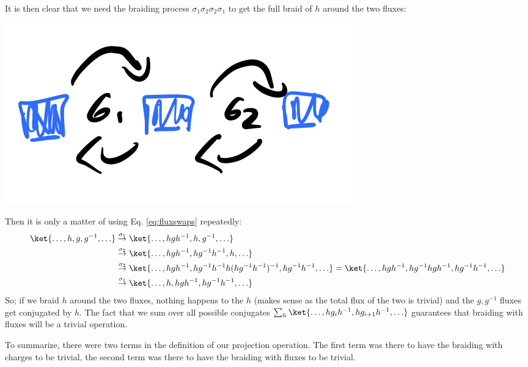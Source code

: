 \begin{enumerate}
    It is then clear that we need the braiding process $\sigma_1\sigma_2\sigma_2\sigma_1$ to get the full braid of $h$ around the two fluxes:
    \begin{center}
        \includegraphics[scale=0.35]{Lectures/Images/lec10-sigmabraid.png}
    \end{center}

    Then it is only a matter of using Eq. \eqref{eq:fluxswaps} repeatedly:
    \begin{equation}
        \begin{split}
            \ket{\ldots, h, g, g^{-1}, \ldots} &\stackrel{\sigma_1}{\to} \ket{\ldots, hgh^{-1}, h, g^{-1}, \ldots}
            \\ &\stackrel{\sigma_2}{\to}\ket{\ldots, hgh^{-1}, hg^{-1}h^{-1}, h, \ldots}
            \\ &\stackrel{\sigma_2}{\to}\ket{\ldots, hgh^{-1}, hg^{-1}h^{-1}h(hg^{-1}h^{-1})^{-1}, hg^{-1}h^{-1}, \ldots} = \ket{\ldots, hgh^{-1}, hg^{-1}hgh^{-1}, hg^{-1}h^{-1}, \ldots}
            \\ &\stackrel{\sigma_1}{\to} \ket{\ldots, h, hgh^{-1}, hg^{-1}h^{-1}, \ldots}
        \end{split}
    \end{equation}
    So; if we braid $h$ around the two fluxes, nothing happens to the $h$ (makes sense as the total flux of the two is trivial) and the $g, g^{-1}$ fluxes get conjugated by $h$. The fact that we sum over all possible conjugates $\sum_h \ket{\ldots, hg_i h^{-1}, h g_{i+1}h^{-1}, \ldots}$ guarantees that braiding with fluxes will be a trivial operation.
\end{enumerate}
To summarize, there were two terms in the definition of our projection operation. The first term was there to have the braiding with charges to be trivial, the second term was there to have the braiding with fluxes to be trivial.